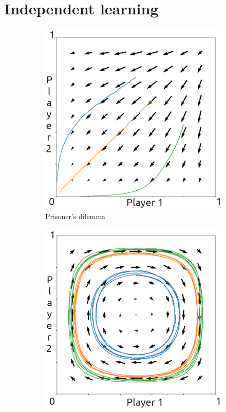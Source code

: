 \documentclass[10pt,a4paper]{article}
\begin{document}
\section{Independent learning}
\begin{figure}[h]
    \centering
    \begin{subfigure}[b]{0.33\textwidth}
        \includegraphics[width=\textwidth]{Figures/cl_pd.png}
    		\caption{Prisoner's dilemma}
    \end{subfigure}
    \begin{subfigure}[b]{0.33\textwidth}
        \includegraphics[width=\textwidth]{Figures/cl_mp.png}

\end{subfigure}
\end{figure}
\end{document}

